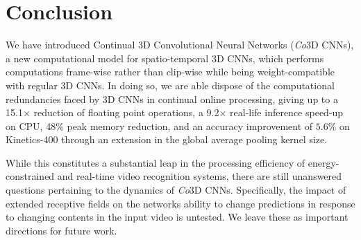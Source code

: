 \section{Conclusion} \label{sec:conclusion}
We have introduced Continual 3D Convolutional Neural Networks (\textit{Co}3D CNNs), a new computational model for spatio-temporal 3D CNNs, which performs computations frame-wise rather than clip-wise while being weight-compatible with regular 3D CNNs. 
In doing so, we are able dispose of the computational redundancies faced by 3D CNNs in continual online processing, giving up to a 15.1$\times$ reduction of floating point operations,
a 9.2$\times$ real-life inference speed-up on CPU, 48\% peak memory reduction,
and an accuracy improvement of $5.6\%$ on Kinetics-400 through an extension in the global average pooling kernel size.

While this constitutes a substantial leap in the processing efficiency of energy-constrained and real-time video recognition systems, there are still unanswered questions pertaining to the dynamics of \textit{Co}3D CNNs.
Specifically,
the impact of extended receptive fields on the networks ability to change predictions in response to changing contents in the input video is untested.
We leave these as important directions for future work.




